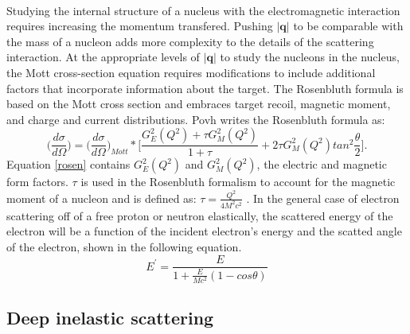 \paragraph{} Studying the internal structure of a nucleus with the electromagnetic interaction requires increasing the momentum transfered. Pushing $|\boldsymbol{q}|$ to be comparable with the mass of a nucleon adds more complexity to the details of the scattering interaction. At the appropriate levels of $|\boldsymbol{q}|$ to study the nucleons in the nucleus, the Mott cross-section equation requires modifications to include additional factors that incorporate information about the target. The Rosenbluth formula is based on the Mott cross section and embraces target recoil, magnetic moment, and charge and current distributions. Povh writes the Rosenbluth formula as:
\begin{equation}
\label{rosen}
\bigg(\frac{d\sigma}{d\Omega}\bigg)=\bigg(\frac{d\sigma}{d\Omega}\bigg)_{Mott} *\bigg\lbrack \frac{G^2_E(Q^2) +\tau G^2_M(Q^2)}{1+\tau} + 2\tau G^2_M(Q^2)tan^2\frac{\theta}{2} \bigg\rbrack.
\end{equation}
Equation \ref{rosen} contains $G^2_E(Q^2)$ and $G^2_M(Q^2)$, the electric and magnetic form factors. $\tau$ is used in the Rosenbluth formalism to account for the magnetic moment of a nucleon and is defined as: $\tau = \frac{Q^2}{4M^2c^2}$ \cite{PnN}. In the general case of electron scattering off of a free proton or neutron elastically, the scattered energy of the electron will be a function of the incident electron's energy and the scatted angle of the electron, shown in the following equation.
\begin{equation}
E^\prime =\frac{E}{1+\frac{E}{Mc^2}(1-cos\theta)}
\end{equation}
\subsection{Deep inelastic scattering}

